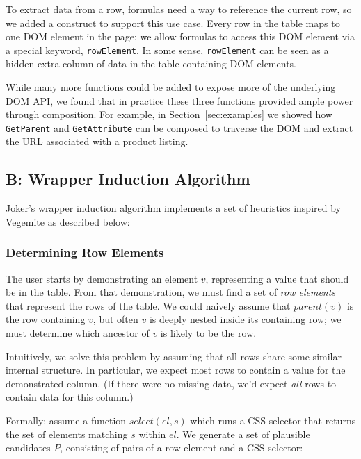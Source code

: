 \documentclass[sigconf,10pt]{acmart}
\begin{document}
To extract data from a row, formulas need a way to reference the current
row, so we added a construct to support this use case. Every row in the
table maps to one DOM element in the page; we allow formulas to access
this DOM element via a special keyword, \texttt{rowElement}. In some
sense, \texttt{rowElement} can be seen as a hidden extra column of data
in the table containing DOM elements.

While many more functions could be added to expose more of the
underlying DOM API, we found that in practice these three functions
provided ample power through composition. For example, in
Section~\ref{sec:examples} we showed how \texttt{GetParent} and
\texttt{GetAttribute} can be composed to traverse the DOM and extract
the URL associated with a product listing.

\hypertarget{appendix-b}{%
\subsection*{B: Wrapper Induction Algorithm}\label{appendix-b}}

Joker's wrapper induction algorithm implements a set of heuristics inspired by Vegemite
as described below:

\hypertarget{determining-row-elements}{%
\subsubsection*{Determining Row
Elements}\label{determining-row-elements}}

The user starts by demonstrating an element \(v\), representing a value
that should be in the table. From that demonstration, we must find a set
of \emph{row elements} that represent the rows of the table. We could
naively assume that \(parent(v)\) is the row containing \(v\), but often
\(v\) is deeply nested inside its containing row; we must determine
which ancestor of \(v\) is likely to be the row.

Intuitively, we solve this problem by assuming that all rows share some
similar internal structure. In particular, we expect most rows to
contain a value for the demonstrated column. (If there were no missing
data, we'd expect \emph{all} rows to contain data for this column.)

Formally: assume a function \(select(el, s)\) which runs a CSS selector
that returns the set of elements matching \(s\) within \(el\). We
generate a set of plausible candidates \(P\), consisting of pairs of a
row element and a CSS selector:
\end{document}
